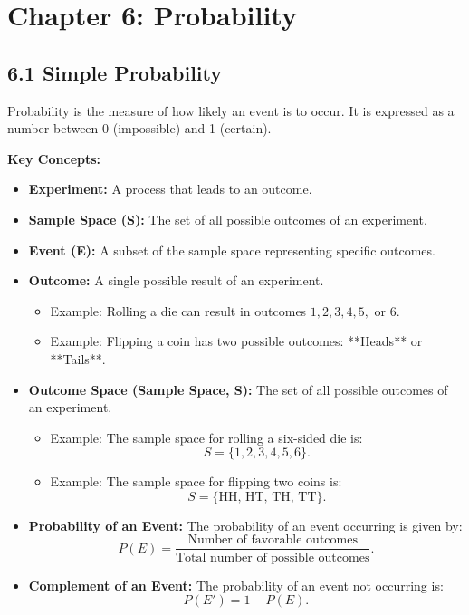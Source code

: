 
\section*{Chapter 6: Probability}

\subsection*{6.1 Simple Probability}
Probability is the measure of how likely an event is to occur. It is expressed as a number between 0 (impossible) and 1 (certain). 

\textbf{Key Concepts:}
\begin{itemize}
	\item \textbf{Experiment:} A process that leads to an outcome.
	\item \textbf{Sample Space (S):} The set of all possible outcomes of an experiment.
	\item \textbf{Event (E):} A subset of the sample space representing specific outcomes.
	\item \textbf{Outcome:} A single possible result of an experiment. 
	\begin{itemize}
		\item Example: Rolling a die can result in outcomes $1,2,3,4,5,$ or $6$.
		\item Example: Flipping a coin has two possible outcomes: **Heads** or **Tails**.
	\end{itemize}
	
	\item \textbf{Outcome Space (Sample Space, S):} The set of all possible outcomes of an experiment.
	\begin{itemize}
		\item Example: The sample space for rolling a six-sided die is:
		\[
		S = \{1,2,3,4,5,6\}.
		\]
		\item Example: The sample space for flipping two coins is:
		\[
		S = \{\text{HH, HT, TH, TT}\}.
		\]
	\end{itemize}
	
	\item \textbf{Probability of an Event:} The probability of an event occurring is given by:
	\[
	P(E) = \frac{\text{Number of favorable outcomes}}{\text{Total number of possible outcomes}}.
	\]
	\item \textbf{Complement of an Event:} The probability of an event not occurring is:
	\[
	P(E') = 1 - P(E).
	\]
	
\end{itemize}

